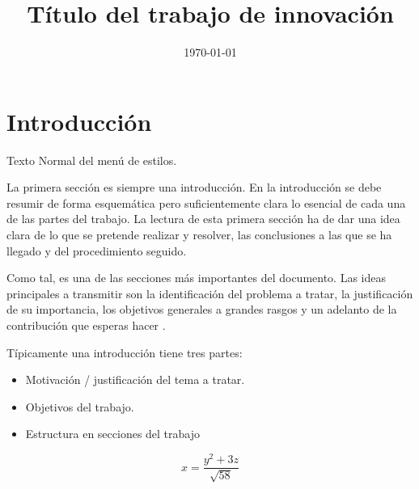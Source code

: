 \documentclass[12pt,a4paper]{proyectoinnovacion}
\title{Título del trabajo de innovación}
\date{\today}
\begin{document}
\maketitle

{
  \setcounter{page}{2} 
  \hypersetup{linkcolor=black}
  \tableofcontents\thispagestyle{fancy}
}
\pagebreak

\section{Introducción}

Texto Normal del menú de estilos.

La primera sección es siempre una introducción. En la introducción se debe resumir de forma esquemática pero suficientemente clara lo esencial de cada una de las partes del trabajo. La lectura de esta primera sección ha de dar una idea clara de lo que se pretende realizar y resolver, las conclusiones a las que se ha llegado y del procedimiento seguido.

Como tal, es una de las secciones más importantes del documento. Las ideas principales a transmitir son la identificación del problema a tratar, la justificación de su importancia, los objetivos generales a grandes rasgos y un adelanto de la contribución que esperas hacer \parencite{rialland2021}.

Típicamente una introducción tiene tres partes:

\begin{itemize}
  \item Motivación / justificación del tema a tratar.
  \item Objetivos del trabajo.
  \item Estructura en secciones del trabajo
\end{itemize}


$$
x = \frac{y^2 + 3z}{\sqrt{58}}
$$
\end{document}
